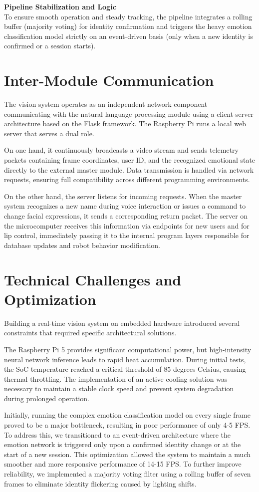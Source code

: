 \documentclass{article}
\begin{document}
\textbf{Pipeline Stabilization and Logic} \\
To ensure smooth operation and steady tracking, the pipeline integrates a rolling buffer (majority voting) for identity confirmation and triggers the heavy emotion classification model strictly on an event-driven basis (only when a new identity is confirmed or a session starts). 

\section{Inter-Module Communication}
The vision system operates as an independent network component communicating with the natural language processing module using a client-server architecture based on the Flask framework. The Raspberry Pi runs a local web server that serves a dual role.

On one hand, it continuously broadcasts a video stream and sends telemetry packets containing frame coordinates, user ID, and the recognized emotional state directly to the external master module. Data transmission is handled via network requests, ensuring full compatibility across different programming environments.

On the other hand, the server listens for incoming requests. When the master system recognizes a new name during voice interaction or issues a command to change facial expressions, it sends a corresponding return packet. The server on the microcomputer receives this information via endpoints for new users and for lip control, immediately passing it to the internal program layers responsible for database updates and robot behavior modification.

\section{Technical Challenges and Optimization}
Building a real-time vision system on embedded hardware introduced several constraints that required specific architectural solutions.

The Raspberry Pi 5 provides significant computational power, but high-intensity neural network inference leads to rapid heat accumulation. During initial tests, the SoC temperature reached a critical threshold of 85 degrees Celsius, causing thermal throttling. The implementation of an active cooling solution was necessary to maintain a stable clock speed and prevent system degradation during prolonged operation.

Initially, running the complex emotion classification model on every single frame proved to be a major bottleneck, resulting in poor performance of only 4-5 FPS. To address this, we transitioned to an event-driven architecture where the emotion network is triggered only upon a confirmed identity change or at the start of a new session. This optimization allowed the system to maintain a much smoother and more responsive performance of 14-15 FPS. To further improve reliability, we implemented a majority voting filter using a rolling buffer of seven frames to eliminate identity flickering caused by lighting shifts.
\end{document}
